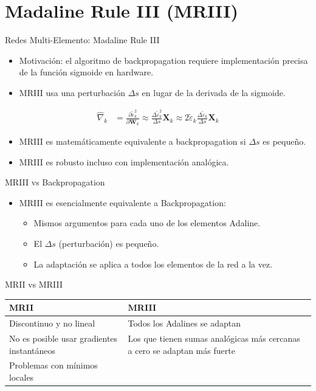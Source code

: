 \documentclass[aspectratio=169,utf8,spanish]{beamer}
\begin{document}
\section{Madaline Rule III (MRIII)}

\begin{frame}{Redes Multi-Elemento: Madaline Rule III}
  \begin{itemize}
    \item Motivación: el algoritmo de backpropagation requiere implementación precisa de la función sigmoide en hardware.
    \item MRIII usa una perturbación $\Delta s$ en lugar de la derivada de la sigmoide.
  \end{itemize}
  \begin{align*}
    \hat{\nabla}_k &= \frac{\partial \tilde{\varepsilon}_k^2}{\partial \mathbf{W}_k}
    \approx \frac{\Delta\tilde{\varepsilon}_k^2}{\Delta s} \mathbf{X}_k
    \approx 2\tilde{\varepsilon}_k \frac{\Delta\tilde{\varepsilon}_k}{\Delta s} \mathbf{X}_k
  \end{align*}
  \begin{itemize}
    \item MRIII es matemáticamente equivalente a backpropagation si $\Delta s$ es pequeño.
    \item MRIII es robusto incluso con implementación analógica.
  \end{itemize}
\end{frame}

\begin{frame}{MRIII vs Backpropagation}
  \begin{itemize}
    \item MRIII es esencialmente equivalente a Backpropagation:
    \begin{itemize}
      \item Mismos argumentos para cada uno de los elementos Adaline.
      \item El $\Delta s$ (perturbación) es pequeño.
      \item La adaptación se aplica a todos los elementos de la red a la vez.
    \end{itemize}
  \end{itemize}
\end{frame}

\begin{frame}{MRII vs MRIII}
  \begin{center}
    \begin{tabular}{p{}|p{}}
      \textbf{MRII} & \textbf{MRIII} \\
      \hline
      Discontinuo y no lineal & Todos los Adalines se adaptan \\
      No es posible usar gradientes instantáneos & Los que tienen sumas analógicas más cercanas a cero se adaptan más fuerte \\
      Problemas con mínimos locales & \\
    \end{tabular}
  \end{center}
\end{frame}
\end{document}
